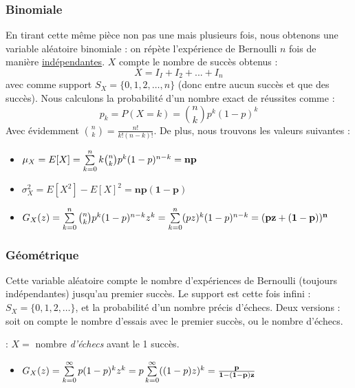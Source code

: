 \documentclass[11pt,a4paper]{article}
\numberwithin{equation}{section}
\begin{document}
\subsubsection{Binomiale}
En tirant cette même pièce non pas une mais plusieurs fois, nous obtenons une variable aléatoire binomiale : on répète l'expérience de Bernoulli $n$ fois de manière \uline{indépendantes}. $X$ compte le nombre de succès obtenus :
\[X = I_I + I_2 + ... + I_n\]
avec comme support $S_X = \{0,1,2,\ldots,n\}$ (donc entre aucun succès et que des succès). Nous calculons la probabilité d'un nombre exact de réussites comme :
\begin{equation}
	p_k = P(X=k) = \binom{n}{k} p^k (1-p)^k
\end{equation}
Avec évidemment $\binom{n}{k} = \frac{n!}{k!(n-k)!}$. De plus, nous trouvons les valeurs suivantes :
\begin{itemize}
    \item $\mu_X = E[X] = \somme{n}{k=0} k\binom{n}{k}p^k(1-p)^{n-k} = \mathbf{np}$
    \item $\sigma_X^2 = E[X^2] - E[X]^2 = \mathbf{np(1-p)}$
    \item $G_X(z) = \somme{n}{k=0}\binom{n}{k}p^k(1-p)^{n-k}z^k = \somme{n}{k=0}(pz)^k(1-p)^{n-k} = \mathbf{(pz+(1-p))^n}$
\end{itemize}

\subsubsection{Géométrique}
Cette variable aléatoire compte le nombre d'expériences de Bernoulli (toujours indépendantes) jusqu'au premier succès. Le support est cette fois infini : $S_X = \{0,1,2,\ldots\}$, et la probabilité d'un nombre précis d'échecs. Deux versions : soit on compte le nombre d'essais avec le premier succès, ou le nombre d'échecs.

 : $X =$ nombre \textit{d'échecs} avant le 1 succès.
    \begin{itemize}
    \item $G_X(z) = \somme{\infty}{k=0}p(1-p)^kz^k = p\somme{\infty}{k=0}((1-p)z)^k = \mathbf{\frac{p}{1-(1-p)z}}$
\end{itemize}
\end{document}
